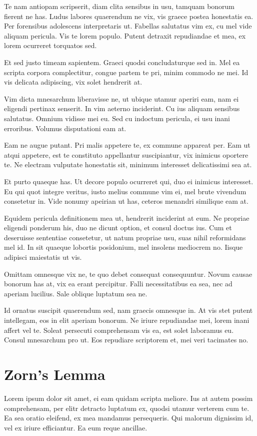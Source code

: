 \documentclass[12pt, a4paper]{article}
\theoremstyle{definition}
\theoremstyle{remark}
\numberwithin{equation}{section}
\numberwithin{figure}{section}
\numberwithin{table}{section}
\begin{document}
        Te nam antiopam scripserit, diam clita sensibus in usu, tamquam bonorum fierent ne has. Ludus labores quaerendum ne vix, vis graece postea honestatis ea. Per forensibus adolescens interpretaris ut. Fabellas salutatus vim ex, cu mel vide aliquam pericula. Vis te lorem populo. Putent detraxit repudiandae et mea, ex lorem ocurreret torquatos sed.

        Et sed justo timeam sapientem. Graeci quodsi concludaturque sed in. Mel ea scripta corpora complectitur, congue partem te pri, minim commodo ne mei. Id vis delicata adipiscing, vix solet hendrerit at.

        Vim dicta mnesarchum liberavisse ne, ut ubique utamur aperiri eam, nam ei eligendi pertinax senserit. In vim aeterno inciderint. Cu ius aliquam sensibus salutatus. Omnium vidisse mei eu. Sed cu indoctum pericula, ei usu inani erroribus. Volumus disputationi eam at.

        Eam ne augue putant. Pri malis appetere te, ex commune appareat per. Eam ut atqui appetere, est te constituto appellantur suscipiantur, vix inimicus oportere te. Ne electram vulputate honestatis sit, minimum interesset delicatissimi sea at.

        Et purto quaeque has. Ut decore populo ocurreret qui, duo ei inimicus interesset. Eu qui quot integre veritus, iusto melius commune vim ei, mel brute vivendum consetetur in. Vide nonumy apeirian ut has, ceteros menandri similique eam at.

        Equidem pericula definitionem mea ut, hendrerit inciderint at eum. Ne propriae eligendi ponderum his, duo ne dicunt option, et consul doctus ius. Cum et deseruisse sententiae consetetur, ut natum propriae usu, suas nihil reformidans mel id. In sit quaeque lobortis posidonium, mel insolens mediocrem no. Iisque adipisci maiestatis ut vis.

        Omittam omnesque vix ne, te quo debet consequat consequuntur. Novum causae bonorum has at, vix ea erant percipitur. Falli necessitatibus ea sea, nec ad aperiam lucilius. Sale oblique luptatum sea ne.

        Id ornatus suscipit quaerendum sed, nam graecis omnesque in. At vis stet putent intellegam, eos in elit aperiam bonorum. Ne iriure repudiandae mei, lorem inani affert vel te. Soleat persecuti comprehensam vis ea, est solet laboramus eu. Consul mnesarchum pro ut. Eos repudiare scriptorem et, mei veri tacimates no.    
    \newpage
    \section{Zorn's Lemma}
        Lorem ipsum dolor sit amet, ei eam quidam scripta meliore. Ius at autem possim comprehensam, per elitr detracto luptatum ex, quodsi utamur verterem cum te. Ea sea oratio eleifend, ex mea mandamus persequeris. Qui malorum dignissim id, vel ex iriure efficiantur. Ea eum reque ancillae.
\end{document}

